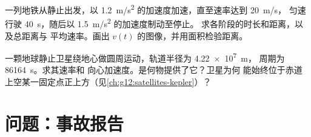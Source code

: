 \begin{exercise}[$\star\star\star$]\label{exo:g12:kinematics-2d:14}
一列地铁从静止出发，以 \qty{1.2}{m/s^2} 的加速度加速，直至速率达到 \qty{20}{m/s}，
匀速行驶 \qty{40}{s}，随后以 \qty{1.5}{m/s^2} 的加速度制动至停止。
求各阶段的时长和距离，以及总距离与
平均速率。画出 $v(t)$ 的图像，并用面积检验距离。
\end{exercise}

\begin{exercise}[$\star\star\star$]\label{exo:g12:kinematics-2d:15}
一颗地球静止卫星绕地心做圆周运动，轨道半径为 \qty{4.22e7}{m}，
周期为 \qty{86164}{s}。求其速率和
向心加速度。是何物提供了它？卫星为何
能始终位于赤道上空某一固定点正上方（见\cref{ch:g12:satellites-kepler}）？
\end{exercise}

\section{问题：事故报告}

